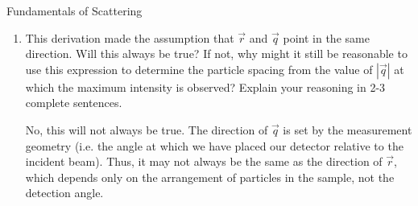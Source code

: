 \begin{activity}{Fundamentals of Scattering}
\begin{exercises}
\begin{enumerate}
			\item This derivation made the assumption that $\vec r$ and $\vec q$ point in the same direction.  Will this always be true?  If not, why might it still be reasonable to use this expression to determine the particle spacing from the value of $|\vec q|$ at which the maximum intensity is observed? Explain your reasoning in 2-3 complete sentences.
			
			\begin{solution}{}
		
				No, this will not always be true.  The direction of $\vec q$ is set by the measurement geometry (i.e. the angle at which we have placed our detector relative to the incident beam).  Thus, it may not always be the same as the direction of $\vec r$, which depends only on the arrangement of particles in the sample, not the detection angle.
				
			\end{solution}
		
		\end{enumerate}
	
\end{exercises}


%
%	


	
\end{activity}